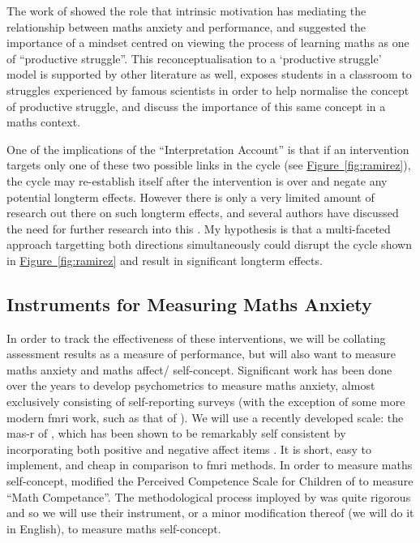 \documentclass[twoside,12pt,a4paper]{report}
\newcommand{\reffig}[1]{\hyperref[fig:#1]{Figure~\ref{fig:#1}}}
\begin{document}
The work of  showed the role that intrinsic motivation has mediating the relationship between maths anxiety and performance, and suggested the importance of a mindset centred on viewing the process of learning maths as one of ``productive struggle''. This reconceptualisation to a `productive struggle' model is supported by other literature as well,  exposes students in a classroom to struggles experienced by famous scientists in order to help normalise the concept of productive struggle, and  discuss the importance of this same concept in a maths context.

One of the implications of the ``Interpretation Account'' is that if an intervention targets only one of these two possible links in the cycle (see \reffig{ramirez}), the cycle may re-establish itself after the intervention is over and negate any potential longterm effects. However there is only a very limited amount of research out there on such longterm effects, and several authors have discussed the need for further research into this \cite{Pellicioni2016,Chang2016}. My hypothesis is that a multi-faceted approach targetting both directions simultaneously could disrupt the cycle shown in \reffig{ramirez} and result in significant longterm effects.

\subsection*{Instruments for Measuring Maths Anxiety}

In order to track the effectiveness of these interventions, we will be collating assessment results as a measure of performance, but will also want to measure maths anxiety and maths affect/ self-concept. Significant work has been done over the years to develop psychometrics to measure maths anxiety, almost exclusively consisting of self-reporting surveys (with the exception of some more modern \gls{fmri} work, such as that of ). We will use a recently developed scale: the \gls{mas-r} of , which has been shown to be remarkably self consistent by incorporating both positive and negative affect items \cite{Bai2011}. It is short, easy to implement, and cheap in comparison to \gls{fmri} methods. In order to measure maths self-concept,  modified the Perceived Competence Scale for Children of  to measure ``Math Competance''. The methodological process imployed by  was quite rigorous and so we will use their instrument, or a minor modification thereof (we will do it in English), to measure maths self-concept.
\end{document}
